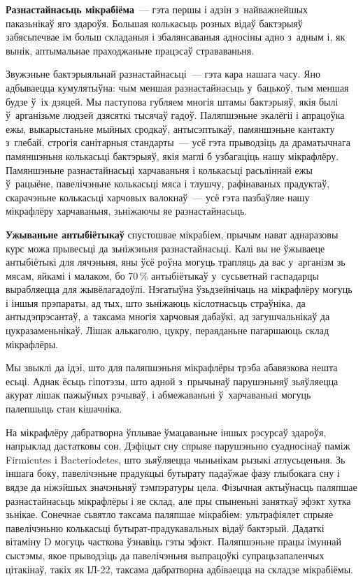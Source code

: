 \textbf{Разнастайнасьць мікрабіёма}~--- гэта першы і адзін з~найважнейшых паказьнікаў яго здароўя. Большая колькасьць розных відаў бактэрыяў забясьпечвае ім больш складаныя і збалянсаваныя адносіны адно з~адным і, як вынік, аптымальнае праходжаньне працэсаў страваваньня.

Звужэньне бактэрыяльнай разнастайнасьці~--- гэта кара нашага часу. Яно адбываецца кумулятыўна: чым меншая разнастайнасьць у~бацькоў, тым меншая будзе ў~іх дзяцей. Мы паступова губляем многія штамы бактэрыяў, якія былі ў~арганізьме людзей дзясяткі тысячаў гадоў. Паляпшэньне экалёгіі і апрацоўка ежы, выкарыстаньне мыйных сродкаў, антысэптыкаў, памяншэньне кантакту з~глебай, строгія санітарныя стандарты~--- усё гэта прыводзіць да драматычнага памяншэньня колькасьці бактэрыяў, якія маглі б узбагаціць нашу мікрафлёру. Памяншэньне разнастайнасьці харчаваньня і колькасьці расьліннай ежы ў~рацыёне, павелічэньне колькасьці мяса і тлушчу, рафінаваных прадуктаў, скарачэньне колькасьці харчовых валокнаў~--- усё гэта пазбаўляе нашу мікрафлёру харчаваньня, зьніжаючы яе разнастайнасьць.


\textbf{Ужываньне антыбіётыкаў} спустошвае мікрабіем, прычым нават аднаразовы курс можа прывесьці да зьніжэньня разнастайнасьці. Калі вы не ўжываеце антыбіётыкі для лячэньня, яны ўсё роўна могуць трапляць да вас у~арганізм зь мясам, яйкамі і малаком, бо 70\,\% антыбіётыкаў у~сусьветнай гаспадарцы вырабляецца для жывёлагадоўлі. Нэгатыўна ўзьдзейнічаць на мікрафлёру могуць і іншыя прэпараты, ад тых, што зьніжаюць кіслотнасьць страўніка, да антыдэпрэсантаў, а~таксама многія харчовыя дабаўкі, ад загушчальнікаў да цукразаменьнікаў. Лішак алькаголю, цукру, пераяданьне пагаршаюць склад мікрафлёры.

Мы звыклі да ідэі, што для паляпшэньня мікрафлёры трэба абавязкова нешта есьці. Аднак ёсьць гіпотэзы, што адной з~прычынаў парушэньняў зьяўляецца акурат лішак пажыўных рэчываў, і абмежаваньні ў~харчаваньні могуць палепшыць стан кішачніка.

На мікрафлёру дабратворна ўплывае ўмацаваньне іншых рэсурсаў здароўя, напрыклад дастатковы сон. Дэфіцыт сну спрыяе парушэньню суадносінаў паміж Firmicutes і Bacteriodetes, што зьяўляецца чыньнікам рызыкі атлусьценьня. Зь іншага боку, павелічэньне прадукцыі бутырату падаўжае фазу глыбокага сну і вядзе да ніжэйшых значэньняў тэмпэратуры цела. Фізычная актыўнасць паляпшае разнастайнасьць мікрафлёры і яе склад, але пры спыненьні заняткаў эфэкт хутка зьнікае. Сонечнае сьвятло таксама паляпшае мікрабіем: ультрафіялет спрыяе павелічэньню колькасьці бутырат-прадукавальных відаў бактэрый. Дадаткі вітаміну D могуць часткова ўзнавіць гэты эфэкт. Паляпшэньне працы імуннай сыстэмы, якое прыводзіць да павелічэньня выпрацоўкі супрацьзапаленчых цітакінаў, такіх як ІЛ-22, таксама дабратворна адбіваецца на складзе мікрабіёмы.

